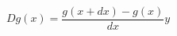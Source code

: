 \documentclass[12pt]{amsart}
\begin{document}
\sicpsize
\[
   D g(x) = \frac{g(x + dx) - g(x)}{dx}y
\]
\end{document}
